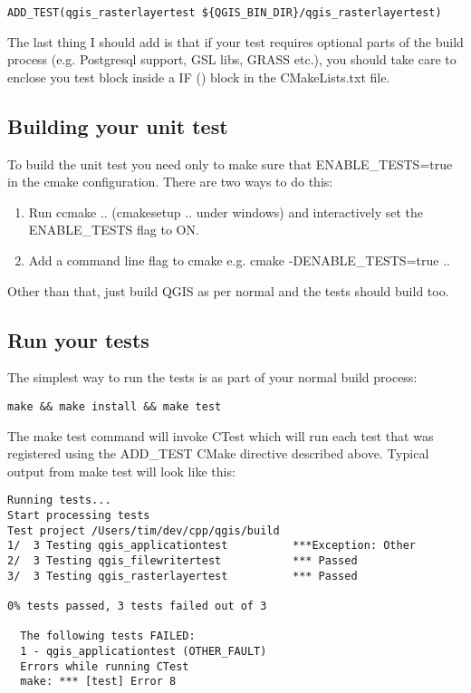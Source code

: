 \begin{verbatim}
ADD_TEST(qgis_rasterlayertest ${QGIS_BIN_DIR}/qgis_rasterlayertest)
\end{verbatim}

The last thing I should add is that if your test requires optional parts of the
build process (e.g. Postgresql support, GSL libs, GRASS etc.), you should take
care to enclose you test block inside a IF () block in the CMakeLists.txt file.

\subsection{Building your unit test}
To build the unit test you need only to make sure that ENABLE\_TESTS=true in the
cmake configuration. There are two ways to do this:

\begin{enumerate}
\item Run ccmake .. (cmakesetup .. under windows) and interactively set 
 the ENABLE\_TESTS flag to ON.
\item Add a command line flag to cmake e.g. cmake -DENABLE\_TESTS=true ..
\end{enumerate}

Other than that, just build QGIS as per normal and the tests should build too.

\subsection{Run your tests}
The simplest way to run the tests is as part of your normal build process:

\begin{verbatim}
make && make install && make test
\end{verbatim}

The make test command will invoke CTest which will run each test that was
registered using the ADD\_TEST CMake directive described above. Typical output
from make test will look like this:

\begin{verbatim}
Running tests...
Start processing tests
Test project /Users/tim/dev/cpp/qgis/build
1/  3 Testing qgis_applicationtest          ***Exception: Other
2/  3 Testing qgis_filewritertest           *** Passed
3/  3 Testing qgis_rasterlayertest          *** Passed

0% tests passed, 3 tests failed out of 3

  The following tests FAILED:
  1 - qgis_applicationtest (OTHER_FAULT)
  Errors while running CTest
  make: *** [test] Error 8
\end{verbatim}

